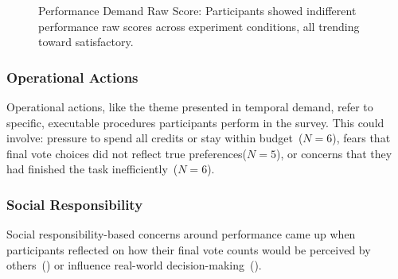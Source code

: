 \begin{figure} %
    \centering
    \captionsetup{width=0.9\linewidth, justification=justified}
    \caption{Performance Demand Raw Score: Participants showed indifferent performance raw scores across experiment conditions, all trending toward satisfactory.}
    \label{fig:performance_cog_score}
\end{figure}

\subsubsection{Operational Actions}
Operational actions, like the theme presented in temporal demand, refer to specific, executable procedures participants perform in the survey. This could involve: pressure to spend all credits or stay within budget~($N=6$), fears that final vote choices did not reflect true preferences($N=5$), or concerns that they had finished the task inefficiently~($N=6$).


\subsubsection{Social Responsibility}
Social responsibility-based concerns around performance came up when participants reflected on how their final vote counts would be perceived by others~() or influence real-world decision-making~().

